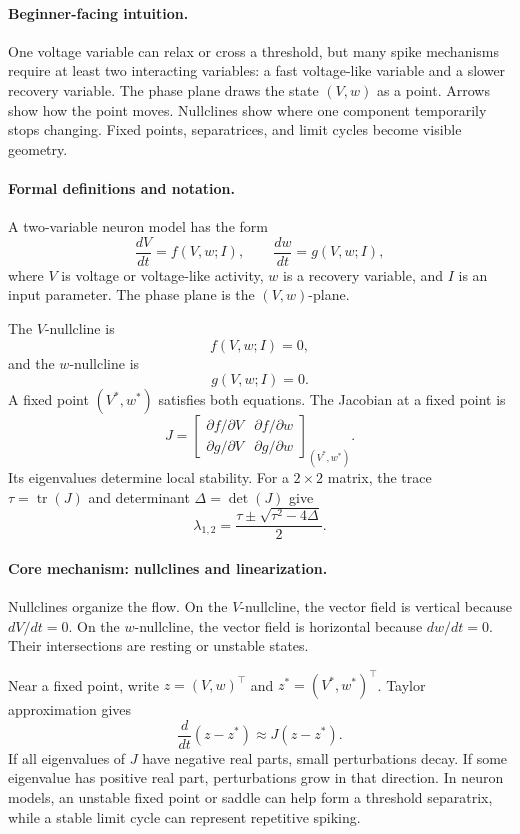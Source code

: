 \paragraph{Beginner-facing intuition.}
One voltage variable can relax or cross a threshold, but many spike mechanisms require at least two interacting variables: a fast voltage-like variable and a slower recovery variable. The phase plane draws the state \((V,w)\) as a point. Arrows show how the point moves. Nullclines show where one component temporarily stops changing. Fixed points, separatrices, and limit cycles become visible geometry.

\paragraph{Formal definitions and notation.}
A two-variable neuron model has the form
\[
\frac{dV}{dt}=f(V,w;I),\qquad
\frac{dw}{dt}=g(V,w;I),
\]
where \(V\) is voltage or voltage-like activity, \(w\) is a recovery variable, and \(I\) is an input parameter. The phase plane is the \((V,w)\)-plane.

The \(V\)-nullcline is
\[
f(V,w;I)=0,
\]
and the \(w\)-nullcline is
\[
g(V,w;I)=0.
\]
A fixed point \((V^*,w^*)\) satisfies both equations. The Jacobian at a fixed point is
\[
J=
\begin{bmatrix}
\partial f/\partial V & \partial f/\partial w\\
\partial g/\partial V & \partial g/\partial w
\end{bmatrix}_{(V^*,w^*)}.
\]
Its eigenvalues determine local stability. For a \(2\times2\) matrix, the trace \(\tau=\operatorname{tr}(J)\) and determinant \(\Delta=\det(J)\) give
\[
\lambda_{1,2}=\frac{\tau\pm\sqrt{\tau^2-4\Delta}}{2}.
\]

\paragraph{Core mechanism: nullclines and linearization.}
Nullclines organize the flow. On the \(V\)-nullcline, the vector field is vertical because \(dV/dt=0\). On the \(w\)-nullcline, the vector field is horizontal because \(dw/dt=0\). Their intersections are resting or unstable states.

Near a fixed point, write \(z=(V,w)^\top\) and \(z^*=(V^*,w^*)^\top\). Taylor approximation gives
\[
\frac{d}{dt}(z-z^*)\approx J(z-z^*).
\]
If all eigenvalues of \(J\) have negative real parts, small perturbations decay. If some eigenvalue has positive real part, perturbations grow in that direction. In neuron models, an unstable fixed point or saddle can help form a threshold separatrix, while a stable limit cycle can represent repetitive spiking.

